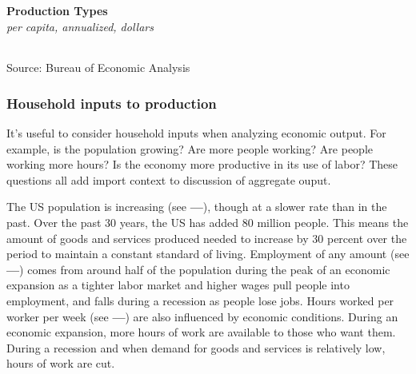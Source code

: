 \documentclass{report}
\begin{document}
\begin{minipage}{0.76\textwidth}

\normalsize \textbf{Production Types}\\
\footnotesize{\textit{per capita, annualized, dollars}}\\
\hspace{-2mm}  \setlength{\tabcolsep}{3.7pt} \color{black!90}
		{\renewcommand{\arraystretch}{1.6}
		 \begin{tabular}{p{38mm} R{12.8mm} R{12.8mm} R{12.8mm} R{12.8mm} R{12.8mm}}
			 \hline
		\end{tabular}}
\vspace{-2mm}

\footnotesize{Source: Bureau of Economic Analysis}
\end{minipage}
\newpage
\begin{minipage}{0.76\textwidth}
\subsubsection*{\color{black!70}\seriffont Household inputs to production}
\small It's useful to consider household inputs when analyzing economic output. For example, is the population growing? Are more people working? Are people working more hours? Is the economy more productive in its use of labor? These questions all add import context to discussion of aggregate ouput.

The US population is increasing (see {\color{lime!90!green}\textbf{---}}), though at a slower rate than in the past. Over the past 30 years, the US has added 80 million people. This means the amount of goods and services produced needed to increase by 30 percent over the period to maintain a constant standard of living. Employment of any amount (see {\color{green!30!teal!90!black}\textbf{---}}) comes from around half of the population during the peak of an economic expansion as a tighter labor market and higher wages pull people into employment, and falls during a recession as people lose jobs. Hours worked per worker per week (see {\color{blue}\textbf{---}}) are also influenced by economic conditions. During an economic expansion, more hours of work are available to those who want them. During a recession and when demand for goods and services is relatively low, hours of work are cut.
\end{minipage}
\vspace{2mm}
\end{document}
